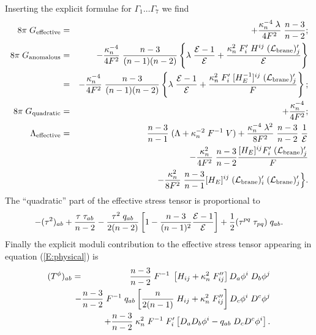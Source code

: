 \documentclass[a4paper,10pt]{article}
\begin{document}
{Inserting the explicit formulae for $\Gamma_1\dots\Gamma_7$ we find
%
\begin{eqnarray}
8\pi\;G_{\mathrm{effective}} &=&  
+ {\kappa_n^{-4}\; \lambda \over4 F^2} \; {n-3\over n-2};
\\
8\pi\;G_{\mathrm{anomalous}} &=&  
- {\kappa_n^{-4}\over4 F^2} \; {n-3\over(n-1)(n-2)}
\left\{
\lambda\;{{\mathcal E}-1\over{\mathcal E}} + {\kappa_n^2 \;F'_i \;H^{ij} \;({\mathcal L}_{\mathrm{brane}})'_j \over {\mathcal E}}
\right\}
\\
&=&
- {\kappa_n^{-4}\over4 F^2} \; {n-3\over(n-1)(n-2)}
\left\{
\lambda\;{{\mathcal E}-1\over{\mathcal E}} + {\kappa_n^2 \;F'_i \;[H_E^{-1}]^{ij} \;({\mathcal L}_{\mathrm{brane}})'_j \over F}
\right\};
\\
8\pi\;G_{\mathrm{quadratic}} &=& 
+ {\kappa_n^{-4}\over4 F^2}; 
\\
\Lambda_{\mathrm{effective}} &=&
{n-3 \over n-1} \;(\Lambda  + \kappa_n^{-2} \; F^{-1} \; V)
+ {\kappa_n^{-4} \; \lambda^2 \over8 F^2} \; {n-3\over n-2} \; {1\over{\mathcal E}}
\nonumber
\\
&&
-{\kappa_n^2\over 4 F^2} \; {n-3\over n-2} {[H_E]^{ij}  F'_i   \;({\mathcal L}_{\mathrm{brane}})'_j\over F}
\nonumber
\\
&&
-{\kappa_n^2\over8 F^2} \; {n-3\over n-1} [H_E]^{ij}  \;({\mathcal L}_{\mathrm{brane}})'_i   \;({\mathcal L}_{\mathrm{brane}})'_j
\Big\}.
\end{eqnarray}
%
The ``quadratic'' part of the effective stress tensor is proportional
to
%
\begin{equation}
- (\tau^2)_{ab} 
+ {\tau \; \tau_{ab}\over n-2} 
- {\tau^2 \; q_{ab}\over2(n-2)} \left[ 1 - {n-3\over (n-1)^2} {{\mathcal E}-1\over{\mathcal E}} \right] 
+ {1\over2} (\tau^{pq} \; \tau_{pq}) \; q_{ab}.
\end{equation}
%
Finally the explicit moduli contribution to the effective stress
tensor appearing in equation (\ref{E:physical}) is
%
\begin{eqnarray}
(T^\phi) _{ab} &=& 
{n-3 \over n-2} \;F^{-1} \; 
\left[H_{ij}+\kappa_n^{2}\;F''_{ij}\right] D_a \phi^i \; D_b \phi^j 
\nonumber \\
&&\hspace{-6mm}
- 
{n-3 \over n-2} \; F^{-1} \; q_{ab}
\left[{n\over 2(n-1) }\; H_{ij}+ \kappa_n^{2}\;F''_{ij}\right] 
D_c \phi^i \; D^c \phi^j 
\nonumber \\
&&\hspace{-6mm}
+{n-3 \over n-2} \; \kappa_n^{2} \; F^{-1} \;F'_i
\left[  D_a D_b \phi^i - q_{ab} \; 
D_c D^c \phi^i \right].
\label{E:t-moduli} 
\end{eqnarray}



}
\end{document}
